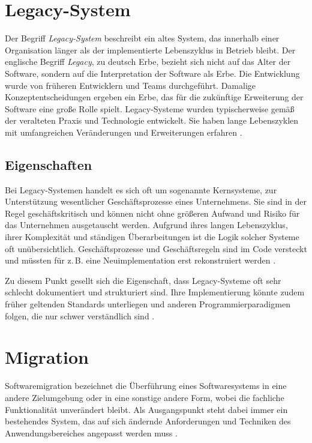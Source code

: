 \section{Legacy-System}
	Der Begriff \textit{Legacy-System} beschreibt ein altes System, das innerhalb einer Organisation länger als der implementierte Lebenszyklus in Betrieb bleibt. Der englische Begriff \textit{Legacy}, zu deutsch Erbe, bezieht sich nicht auf das Alter der Software, sondern auf die Interpretation der Software als Erbe. Die Entwicklung wurde von früheren Entwicklern und Teams durchgeführt. Damalige Konzeptentscheidungen ergeben ein Erbe, das für die zukünftige Erweiterung der Software eine große Rolle spielt. Legacy-Systeme wurden typischerweise gemäß der veralteten Praxis und Technologie entwickelt. Sie haben lange Lebenszyklen mit umfangreichen Veränderungen und Erweiterungen erfahren \cite{sneed2016softwaremigration}.

\subsection{Eigenschaften}
	Bei Legacy-Systemen handelt es sich oft um sogenannte Kernsysteme, zur Unterstützung wesentlicher Geschäftsprozesse eines Unternehmens. Sie sind in der Regel geschäftskritisch und können nicht ohne größeren Aufwand und Risiko für das Unternehmen ausgetauscht werden. Aufgrund ihres langen Lebenszyklus, ihrer Komplexität und ständigen Überarbeitungen ist die Logik solcher Systeme oft unübersichtlich. Geschäftsprozesse und Geschäftsregeln sind im Code versteckt und müssten für z.\,B. eine Neuimplementation erst rekonstruiert werden \cite{martens2016ablosung}.

	Zu diesem Punkt gesellt sich die Eigenschaft, dass Legacy-Systeme oft sehr schlecht dokumentiert und strukturiert sind. Ihre Implementierung könnte zudem früher geltenden Standards unterliegen und anderen Programmierparadigmen folgen, die nur schwer verständlich sind \cite{stahlknecht2002einfuhrung}.

\section{Migration} \label{ssub:migration}
	Softwaremigration bezeichnet die Überführung eines Softwaresystems in eine andere Zielumgebung oder in eine sonstige andere Form, wobei die fachliche Funktionalität unverändert bleibt. Als Ausgangspunkt steht dabei immer ein bestehendes System, das auf sich ändernde Anforderungen und Techniken des Anwendungsbereiches angepasst werden muss \cite{sneed2016softwaremigration}.

